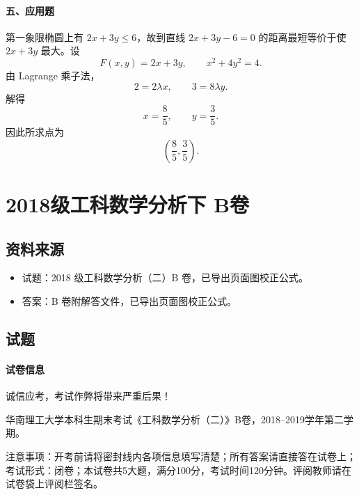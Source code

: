 \paragraph*{五、应用题}
第一象限椭圆上有 \(2x+3y\le6\)，故到直线 \(2x+3y-6=0\) 的距离最短等价于使 \(2x+3y\) 最大。设
\[
  F(x,y)=2x+3y,\qquad x^2+4y^2=4.
\]
由 Lagrange 乘子法，
\[
  2=2\lambda x,\qquad 3=8\lambda y.
\]
解得
\[
  x=\frac85,\qquad y=\frac35.
\]
因此所求点为
\[
  \left(\frac85,\frac35\right).
\]

\section{2018级工科数学分析下 B卷}

\subsection{资料来源}
\begin{itemize}
  \item 试题：2018 级工科数学分析（二）B 卷，已导出页面图校正公式。
  \item 答案：B 卷附解答文件，已导出页面图校正公式。
\end{itemize}

\subsection{试题}

\paragraph*{试卷信息}
诚信应考，考试作弊将带来严重后果！

华南理工大学本科生期末考试《工科数学分析（二）》B卷，2018--2019学年第二学期。

注意事项：开考前请将密封线内各项信息填写清楚；所有答案请直接答在试卷上；考试形式：闭卷；本试卷共5大题，满分100分，考试时间120分钟。评阅教师请在试卷袋上评阅栏签名。

